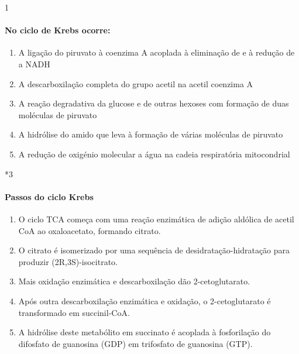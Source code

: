 \documentclass[\mainfilename]{subfiles}
\begin{document}
\begin{questionBox}1{}
    
    \paragraph{No ciclo de Krebs ocorre:}
    \begin{enumerate}
        \item A ligação do piruvato à coenzima A acoplada à eliminação de  e à redução de  a NADH
        \item A descarboxilação completa do grupo acetil na acetil coenzima A
        \item A reação degradativa da glucose e de outras hexoses com formação de duas moléculas de piruvato
        \item A hidrólise do amido que leva à formação de várias moléculas de piruvato
        \item A redução de oxigénio molecular a água na cadeia respiratória mitocondrial
    \end{enumerate}

    \vspace{-5ex}
    
    \begin{questionBox}*3{}
        
        \paragraph{Passos do ciclo Krebs}
        \begin{enumerate}
            \item O ciclo TCA começa com uma reação enzimática de adição aldólica de acetil CoA ao oxaloacetato, formando citrato.

            \item O citrato é isomerizado por uma sequência de desidratação-hidratação para produzir (2R,3S)-isocitrato.
            
            \item Mais oxidação enzimática e descarboxilação dão 2-cetoglutarato.
            
            \item Após outra descarboxilação enzimática e oxidação, o 2-cetoglutarato é transformado em succinil-CoA.
            
            \item A hidrólise deste metabólito em succinato é acoplada à fosforilação do difosfato de guanosina (GDP) em trifosfato de guanosina (GTP).
            

\end{enumerate}
\end{questionBox}
\end{questionBox}
\end{document}
